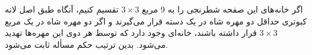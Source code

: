     \p
    اگر خانه‌های این صفحه شطرنجی را به 9 مربع
    $3\times3$
    تقسیم کنیم، آنگاه طبق اصل لانه کبوتری حداقل دو مهره شاه در یک دسته قرار می‌گیرند و اگر دو مهره شاه در یک مربع 
    $3\times3$
    قرار داشته باشند، خانه‌ای وجود دارد که توسط هر دوی این مهره‌ها تهدید می‌شود. بدین ترتیب حکم مسأله ثابت می‌شود.